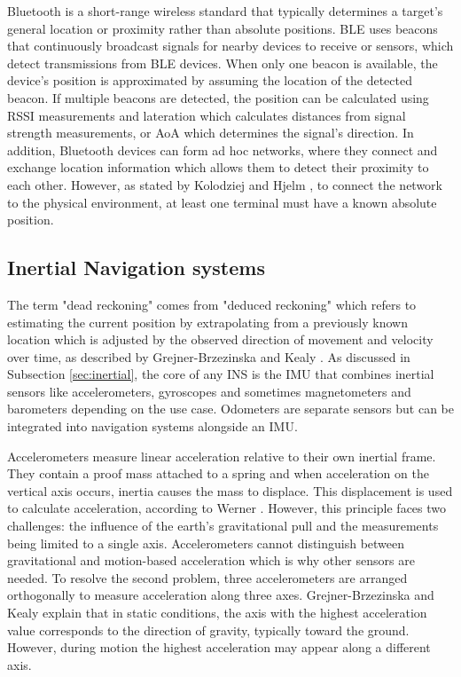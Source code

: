 Bluetooth is a short-range wireless standard that typically determines a target's general location or proximity rather than absolute positions.
\ac{BLE} uses beacons that continuously broadcast signals for nearby devices to receive or sensors, which detect transmissions from \acs{BLE} devices.
When only one beacon is available, the device's position is approximated by assuming the location of the detected beacon. 
If multiple beacons are detected, the position can be calculated using \ac{RSSI} measurements and lateration which calculates distances from signal strength measurements, or \acs{AoA} which determines the signal's direction.
In addition, Bluetooth devices can form ad hoc networks, where they connect and exchange location information which allows them to detect their proximity to each other. 
However, as stated by Kolodziej and Hjelm \cite{kolodziej2017local}, to connect the network to the physical environment, at least one terminal must have a known absolute position.

\subsection{Inertial Navigation systems}
\label{sec:ins}
The term "dead reckoning" comes from "deduced reckoning" which refers to estimating the current position by extrapolating from a previously known location which is adjusted by the observed direction of movement and velocity over time, as described by Grejner-Brzezinska and Kealy \cite{grejner2004positioning}.
As discussed in Subsection \ref{sec:inertial}, the core of any \acs{INS} is the \acs{IMU} that combines inertial sensors like accelerometers, gyroscopes and sometimes magnetometers and barometers depending on the use case. 
Odometers are separate sensors but can be integrated into navigation systems alongside an \acs{IMU}.

Accelerometers measure linear acceleration relative to their own inertial frame.
They contain a proof mass attached to a spring and when acceleration on the vertical axis occurs, inertia causes the mass to displace.
This displacement is used to calculate acceleration, according to Werner \cite{werner2014indoor}.
However, this principle faces two challenges: the influence of the earth's gravitational pull and the measurements being limited to a single axis.
Accelerometers cannot distinguish between gravitational and motion-based acceleration which is why other sensors are needed.
To resolve the second problem, three accelerometers are arranged orthogonally to measure acceleration along three axes.
Grejner-Brzezinska and Kealy \cite{grejner2004positioning} explain that in static conditions, the axis with the highest acceleration value corresponds to the direction of gravity, typically toward the ground. 
However, during motion the highest acceleration may appear along a different axis.

